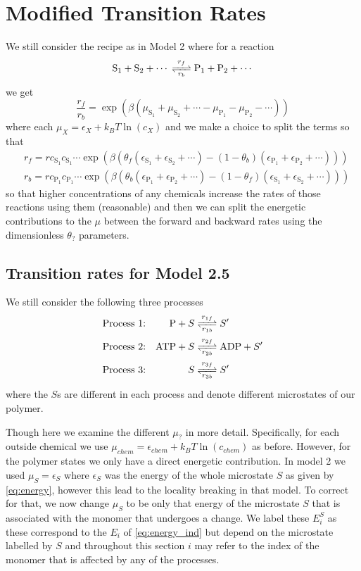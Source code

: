 \documentclass[11pt]{article}
\begin{document}
\section{Modified Transition Rates}
We still consider the recipe as in Model 2 where for a reaction
\begin{equation}
    \ce{S_1 + S_2 + $\cdots$ <=>[$r_f$][$r_b$] P_1 + P_2 + $\cdots$}
\end{equation}
we get
\begin{equation}
    \frac{r_f}{r_b} = \exp(\beta(\mu_{\text{S}_1} + \mu_{\text{S}_2} + \cdots - \mu_{\text{P}_1} - \mu_{\text{P}_2} - \cdots))
\end{equation}
where each $\mu_X = \epsilon_X + \si{k_B}T\ln(c_X)$ and we make a choice to split the terms so that
\begin{align}
    &r_f = r c_{\text{S}_1}c_{\text{S}_1}\cdots \exp(\beta(\theta_f(\epsilon_{\text{S}_1} + \epsilon_{\text{S}_2} + \cdots) - (1-\theta_b)(\epsilon_{\text{P}_1} + \epsilon_{\text{P}_2} + \cdots))) \\
    &r_b = r c_{\text{P}_1}c_{\text{P}_1}\cdots \exp(\beta(\theta_b(\epsilon_{\text{P}_1} + \epsilon_{\text{P}_2} + \cdots) - (1-\theta_f)(\epsilon_{\text{S}_1} + \epsilon_{\text{S}_2} + \cdots)))
\end{align}
so that higher concentrations of any chemicals increase the rates of those reactions using them (reasonable) and then we can split the energetic contributions to the $\mu$ between the forward and backward rates using the dimensionless $\theta_?$ parameters.

\subsection{Transition rates for Model 2.5}
We still consider the following three processes
\begin{align}
    \text{Process 1:} && \ce{P + $S$ &<=>[$r_{1f}$][$r_{1b}$] $S'$} \\
    \text{Process 2:} && \ce{ATP + $S$ &<=>[$r_{2f}$][$r_{2b}$] ADP + $S'$} \\
    \text{Process 3:} && \ce{$S$ &<=>[$r_{3f}$][$r_{3b}$] $S'$}
\end{align}
where the $S$s are different in each process and denote different microstates of our polymer.

Though here we examine the different $\mu_?$ in more detail.
Specifically, for each outside chemical we use $\mu_{chem} = \epsilon_{chem}+\si{k_B}T\ln(c_{chem})$ as before.
However, for the polymer states we only have a direct energetic contribution.
In model 2 we used $\mu_S=\epsilon_S$ where $\epsilon_S$ was the energy of the whole microstate $S$ as given by \cref{eq:energy}, however this lead to the locality breaking in that model.
To correct for that, we now change $\mu_S$ to be only that energy of the microstate $S$ that is associated with the monomer that undergoes a change.
We label these $E^S_i$ as these correspond to the $E_i$ of \cref{eq:energy_ind} but depend on the microstate labelled by $S$ and throughout this section $i$ may refer to the index of the monomer that is affected by any of the processes.
\end{document}

